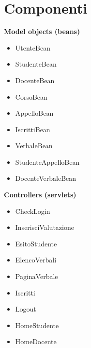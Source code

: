 \documentclass[a4paper,12pt]{scrreprt}
\begin{document}
\section{Componenti}
\noindent
\begin{minipage}[t]{0.48\textwidth}
\textbf{Model objects (beans)}
\begin{itemize}
    \item UtenteBean
    \item StudenteBean
    \item DocenteBean
    \item CorsoBean
    \item AppelloBean
    \item IscrittiBean
    \item VerbaleBean
    \item StudenteAppelloBean
    \item DocenteVerbaleBean
\end{itemize}
\textbf{Controllers (servlets)}
\begin{itemize}
    \item CheckLogin
    \item InserisciValutazione
    \item EsitoStudente
    \item ElencoVerbali
    \item PaginaVerbale
    \item Iscritti
    \item Logout
    \item HomeStudente
    \item HomeDocente
\end{itemize}

\end{minipage}
\hfill
\end{document}
